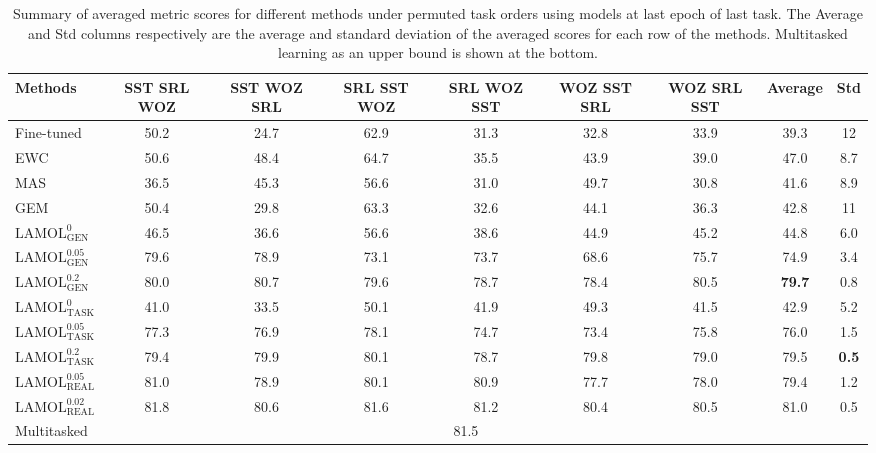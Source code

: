 \begin{table}[t]
\centering
\begin{adjustbox}{max width=\textwidth}
    \begin{tabular}{l*{6}c|c|c}
    \toprule
    Methods & {\scriptsize SST SRL WOZ} & {\scriptsize SST WOZ SRL} & {\scriptsize SRL SST WOZ} & {\scriptsize SRL WOZ SST} & {\scriptsize WOZ SST SRL} & {\scriptsize WOZ SRL SST} & Average & Std \\
    \midrule
    Fine-tuned & 50.2 & 24.7 & 62.9 & 31.3 & 32.8 & 33.9 & 39.3 & 12\\
    EWC & 50.6 & 48.4 & 64.7 & 35.5 & 43.9 & 39.0 & 47.0 & 8.7\\
    MAS & 36.5 & 45.3 & 56.6 & 31.0 & 49.7 & 30.8 & 41.6 & 8.9\\
    GEM & 50.4 & 29.8 & 63.3 & 32.6 & 44.1 & 36.3 & 42.8 & 11 \\
    $\text{LAMOL}_{\text{GEN}}^{0}$ & 46.5 & 36.6 & 56.6 & 38.6 & 44.9 & 45.2 & 44.8 & 6.0\\
    $\text{LAMOL}_{\text{GEN}}^{0.05}$ & 79.6 & 78.9 & 73.1 & 73.7 & 68.6 & 75.7 & 74.9 & 3.4\\
    $\text{LAMOL}_{\text{GEN}}^{0.2}$ & 80.0 & 80.7 & 79.6 & 78.7 & 78.4 & 80.5 & \textbf{79.7} & 0.8 \\
    $\text{LAMOL}_{\text{TASK}}^{0}$ & 41.0 & 33.5 & 50.1 & 41.9 & 49.3 & 41.5 & 42.9 & 5.2\\
    $\text{LAMOL}_{\text{TASK}}^{0.05}$ & 77.3 & 76.9 & 78.1 & 74.7 & 73.4 & 75.8 & 76.0 & 1.5\\
    $\text{LAMOL}_{\text{TASK}}^{0.2}$ & 79.4 & 79.9 & 80.1 & 78.7 & 79.8 & 79.0 & 79.5 & \textbf{0.5}\\
    \midrule
    $\text{LAMOL}_{\text{REAL}}^{0.05}$ & 81.0 & 78.9 & 80.1 & 80.9 & 77.7 & 78.0 & 79.4 & 1.2\\
    $\text{LAMOL}_{\text{REAL}}^{0.02}$ & 81.8 & 80.6 & 81.6 & 81.2 & 80.4 & 80.5 & 81.0 & 0.5\\
    \midrule
    Multitasked & \multicolumn{7}{c}{81.5} \\
    \bottomrule
    \end{tabular}
    \end{adjustbox}
    \caption{Summary of averaged metric scores for different methods under permuted task orders using models at last epoch of last task. The Average and Std columns respectively are the average and standard deviation of the averaged scores for each row of the methods. Multitasked learning as an upper bound is shown at the bottom.}
\label{tab:small_perm}
\end{table}
